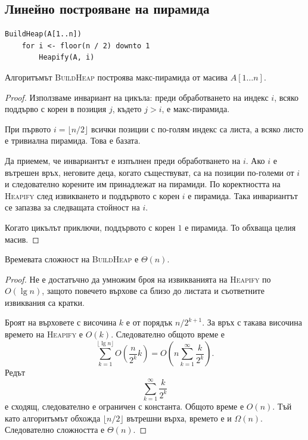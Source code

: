 \subsection{Линейно построяване на пирамида}\label{s:6.4.2}

\begin{verbatim}
BuildHeap(A[1..n])
    for i <- floor(n / 2) downto 1
        Heapify(A, i)
\end{verbatim}

\begin{thm}
Алгоритъмът \textsc{BuildHeap} построява макс-пирамида от масива $A[1\ldots n]$.
\end{thm}

\begin{proof}
Използваме инвариант на цикъла: преди обработването на индекс $i$, всяко поддърво с корен в позиция $j$, където $j>i$, е макс-пирамида.

При първото $i=\lfloor n/2\rfloor$ всички позиции с по-голям индекс са листа, а всяко листо е тривиална пирамида. Това е базата.

Да приемем, че инвариантът е изпълнен преди обработването на $i$. Ако $i$ е вътрешен връх, неговите деца, когато съществуват, са на позиции по-големи от $i$ и следователно корените им принадлежат на пирамиди. По коректността на \textsc{Heapify} след извикването и поддървото с корен $i$ е пирамида. Така инвариантът се запазва за следващата стойност на $i$.

Когато цикълът приключи, поддървото с корен $1$ е пирамида. То обхваща целия масив.
\end{proof}

\begin{thm}
Времевата сложност на \textsc{BuildHeap} е $\Theta(n)$.
\end{thm}

\begin{proof}
Не е достатъчно да умножим броя на извикванията на \textsc{Heapify} по $O(\lg n)$, защото повечето върхове са близо до листата и съответните извиквания са кратки.

Броят на върховете с височина $k$ е от порядък $n/2^{k+1}$. За връх с такава височина времето на \textsc{Heapify} е $O(k)$. Следователно общото време е
\[
\sum_{k=1}^{\lfloor\lg n\rfloor}
O\left(\frac{n}{2^k}k\right)
=
O\left(
n\sum_{k=1}^{\infty}\frac{k}{2^k}
\right).
\]
Редът
\[
\sum_{k=1}^{\infty}\frac{k}{2^k}
\]
е сходящ, следователно е ограничен с константа. Общото време е $O(n)$. Тъй като алгоритъмът обхожда $\lfloor n/2\rfloor$ вътрешни върха, времето е и $\Omega(n)$. Следователно сложността е $\Theta(n)$.
\end{proof}


